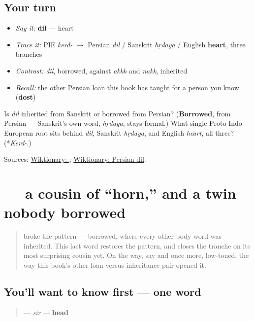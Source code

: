 \subsection*{Your turn}
\begin{itemize}
\raggedright
  \item \emph{Say it:} \textbf{dil} — heart
  \item \emph{Trace it:} PIE \emph{kerd-} $\to$ Persian \emph{dil} / Sanskrit \emph{hṛdaya} / English \textbf{heart}, three branches
  \item \emph{Contrast:} \emph{dil}, borrowed, against \emph{akkh} and \emph{nakk}, inherited
  \item \emph{Recall:} the other Persian loan this book has taught for a person you know (\textbf{dost})
\end{itemize}

\begin{tcolorbox}[breakable,colback=teal!4,colframe=teal!35!black,title={Before you move on}]
Is \emph{dil} inherited from Sanskrit or borrowed from Persian? (\textbf{Borrowed}, from Persian — Sanskrit's own word, \emph{hṛdaya}, stays formal.) What single Proto-Indo-European root sits behind \emph{dil}, Sanskrit \emph{hṛdaya}, and English \emph{heart}, all three? (*\emph{Kerd-}.)

Sources: \href{https://en.wiktionary.org/wiki/\%E0\%A8\%A6\%E0\%A8\%BF\%E0\%A8\%B2}{Wiktionary: }; \href{https://en.wiktionary.org/wiki/\%D8\%AF\%D9\%84}{Wiktionary: Persian dil}.
\end{tcolorbox}
\section[\texorpdfstring{\pa{ਸਿਰ} (sir)}{ਸਿਰ (sir)}]{ — a cousin of \textquotedblleft{}horn,\textquotedblright{} and a twin nobody borrowed}

\label{lesson:PA-C13-sir}



\begin{quote}
\textbf{} broke the pattern — borrowed, where every other body word was inherited. This last word restores the pattern, and closes the tranche on its most surprising cousin yet. On the way, say \textbf{} and \textbf{} once more, low-toned, the way this book's other loan-versus-inheritance pair opened it.
\end{quote}

\subsection*{You'll want to know first — one word}
\begin{quote}
\textbf{} — \emph{sir} — \textbf{head}
\end{quote}

